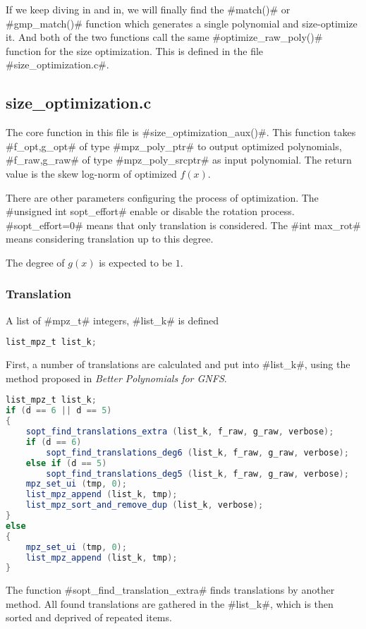 \documentclass[a4paper]{article}
\begin{document}
If we keep diving in and in, we will finally find the #match()# or #gmp_match()# function
which generates a single polynomial and size-optimize it.
And both of the two functions call the same #optimize_raw_poly()# function for the size optimization.
This is defined in the file #size_optimization.c#.

\subsection{size\_optimization.c}

The core function in this file is #size_optimization_aux()#.
This function takes #f_opt,g_opt# of type #mpz_poly_ptr# to output optimized polynomials,
#f_raw,g_raw# of type #mpz_poly_srcptr# as input polynomial.
The return value is the skew log-norm of optimized $f(x)$.

There are other parameters configuring the process of optimization.
The #unsigned int sopt_effort# enable or disable the rotation process.
#sopt_effort=0# means that only translation is considered.
The #int max_rot# means considering translation up to this degree.

The degree of $g(x)$ is expected to be $1$.

\subsubsection{Translation}

A list of #mpz_t# integers, #list_k# is defined
\begin{lstlisting}[language=Java]
list_mpz_t list_k;
\end{lstlisting}
First, a number of translations are calculated and put into #list_k#,
using the method proposed in \textit{Better Polynomials for GNFS}.

\begin{lstlisting}[language=Java]
list_mpz_t list_k;
if (d == 6 || d == 5)
{
    sopt_find_translations_extra (list_k, f_raw, g_raw, verbose);
    if (d == 6)
        sopt_find_translations_deg6 (list_k, f_raw, g_raw, verbose);
    else if (d == 5)
        sopt_find_translations_deg5 (list_k, f_raw, g_raw, verbose);
    mpz_set_ui (tmp, 0);
    list_mpz_append (list_k, tmp);
    list_mpz_sort_and_remove_dup (list_k, verbose);
}
else
{
    mpz_set_ui (tmp, 0);
    list_mpz_append (list_k, tmp);
}
\end{lstlisting}

The function #sopt_find_translation_extra# finds translations by another method.
All found translations are gathered in the #list_k#, which is then sorted and deprived of repeated items.
\end{document}

